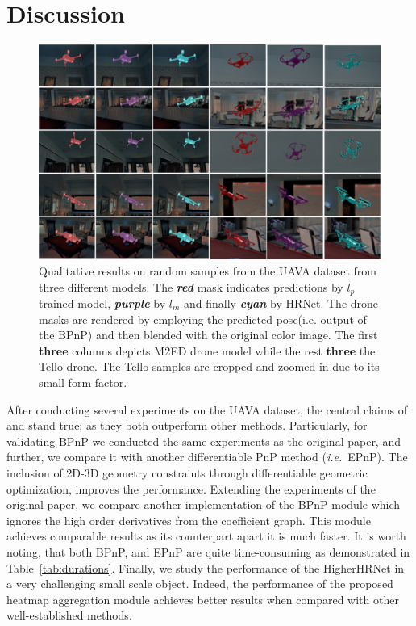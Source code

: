 \section{Discussion}
\begin{figure}[hbt!]
  \centering
  \includegraphics[scale=0.45]{../openreview/figures/qualitativeboth_2.png}
  \caption{Qualitative results on random samples from the UAVA dataset from three different models. The \emph{\color{red}\textbf{red}} mask indicates predictions by $l_p$ trained model, \emph{\color{purple}\textbf{purple}} by $l_m$ and finally \emph{\color{cyan}\textbf{cyan}} by HRNet. 
  The drone masks are rendered by employing the predicted pose(i.e. output of the BPnP) and then blended with the original color image. 
  The first \textbf{three} columns depicts M2ED drone model while the rest \textbf{three} the Tello drone. 
  The Tello samples are cropped and zoomed-in due to its small form factor.}
\label{fig:qualitativeboth}
\end{figure}
After conducting several experiments on the UAVA dataset, the central claims of \cite{chen2020end} and \cite{cheng2020higherhrnet} stand true; as they both outperform other methods. 
Particularly, for validating BPnP we conducted the same experiments as the original paper, and further, we compare it with another differentiable PnP method (\textit{i.e.}~EPnP). 
The inclusion of 2D-3D geometry constraints through differentiable geometric optimization, improves the performance.
Extending the experiments of the original paper, we compare another implementation of the BPnP module which ignores the high order derivatives from the coefficient graph. 
This module achieves comparable results as its counterpart apart it is much faster. It is worth noting, that both BPnP, and EPnP are quite time-consuming as demonstrated in Table~\ref{tab:durations}. 
Finally, we study the performance of the HigherHRNet \cite{chen2020end} in a very challenging small scale object. Indeed, the performance of the proposed heatmap aggregation module achieves better results when compared with other well-established methods.
